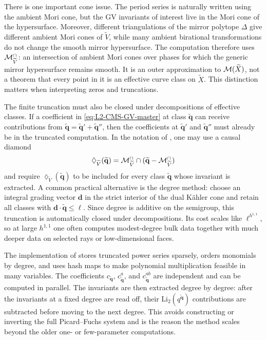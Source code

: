 There is one important cone issue.  The period series is naturally
written using the ambient Mori cone, but the GV invariants of
interest live in the Mori cone of the hypersurface.  Moreover,
different triangulations of the mirror polytope $\Delta$ give
different ambient Mori cones of $\widetilde V$, while many ambient
birational transformations do not change the smooth mirror
hypersurface.  The computation therefore uses
$\mathcal{M}_{\widetilde V}^\cap$: an intersection of ambient Mori cones over
phases for which the generic mirror hypersurface remains smooth.  It
is an outer approximation to $\mathcal{M}(\widetilde X)$, not a theorem that
every point in it is an effective curve class on $\widetilde X$.
This distinction matters when interpreting zeros and truncations.

The finite truncation must also be closed under decompositions of
effective classes.  If a coefficient in
\eqref{eq:L2-CMS-GV-master} at class $\widetilde{\mathbf q}$ can
receive contributions from
$\widetilde{\mathbf q}=\widetilde{\mathbf q}'
+\widetilde{\mathbf q}''$, then the coefficients at
$\widetilde{\mathbf q}'$ and $\widetilde{\mathbf q}''$ must already
be in the truncated computation.  In the notation of
\cite{Demirtas:2023als},
one may use a causal diamond
\begin{equation}
    \lozenge_{\widetilde V}(\widetilde{\mathbf q})
      =
      \mathcal{M}_{\widetilde V}^\cap
      \cap(\widetilde{\mathbf q}-\mathcal{M}_{\widetilde V}^\cap)
\end{equation}
and require $\lozenge_{\widetilde V}(\widetilde{\mathbf q})$ to be
included for every class $\widetilde{\mathbf q}$ whose invariant is
extracted.  A common practical alternative is the degree method:
choose an integral grading vector $\mathbf d$ in the strict interior
of the dual K\"ahler cone and retain all classes with
$\mathbf d\cdot\widetilde{\mathbf q}\leq \ell$.  Since degree is
additive on the semigroup, this truncation is automatically closed
under decompositions.  Its cost scales like
$\ell^{h^{1,1}}$, so at large $h^{1,1}$ one often computes
modest-degree bulk data together with much deeper data on selected
rays or low-dimensional faces.

The
implementation of \cite{Demirtas:2023als}  stores truncated power series sparsely, orders
monomials by degree, and uses hash maps to make polynomial
multiplication feasible in many variables.  The coefficients
$c_{\widetilde{\mathbf q}}$,
$c^a_{\widetilde{\mathbf q}}$, and
$c^{ab}_{\widetilde{\mathbf q}}$ are independent and can
be computed in parallel.  The invariants are then extracted degree by
degree:
after the invariants at a fixed degree are read off, their
$\mathrm{Li}_2(q^{\widetilde{\mathbf q}})$ contributions are
subtracted before moving to the next degree.  This avoids constructing
or inverting the full Picard--Fuchs system and is the reason the
method scales beyond the older one- or few-parameter computations.

